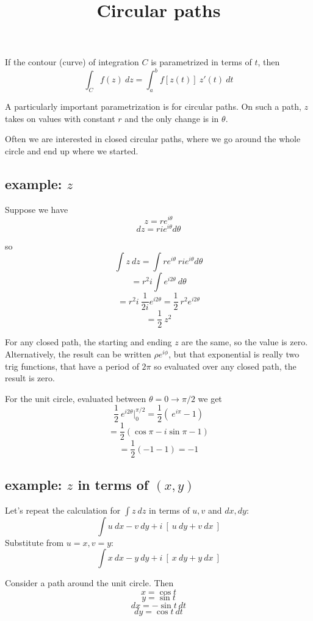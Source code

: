 \documentclass[11pt, oneside]{article}
\title{Circular paths}
\date{}
\begin{document}
\maketitle
\Large


If the contour (curve) of integration $C$ is parametrized in terms of $t$, then
\[ \int_C f(z) \ dz = \int_a^b f[z(t)] \ z'(t) \ dt \]

A particularly important parametrization is for circular paths.  On such a path, $z$ takes on values with constant $r$ and the only change is in $\theta$.

Often we are interested in closed circular paths, where we go around the whole circle and end up where we started.

\subsection*{example:  $z$}

Suppose we have
\[ z = re^{i \theta} \]
\[ dz = r i e^{i \theta} d \theta \]

so 
\[ \int z \ dz = \int re^{i \theta} \ r i e^{i \theta} d \theta \]
\[ = r^2 i \int e^{i 2\theta}  \ d \theta \]
\[ = r^2 i \ \frac{1}{2i} e^{i 2 \theta} = \frac{1}{2} \ r^2 e^{i 2 \theta} \]
\[ = \frac{1}{2} \ z^2 \]

For any closed path, the starting and ending $z$ are the same, so the value is zero.  Alternatively, the result can be written $\rho e^{i \phi}$, but that exponential is really two trig functions, that have a period of $2 \pi$ so evaluated over any closed path, the result is zero.

For the unit circle, evaluated between $\theta = 0 \rightarrow \pi/2$ we get
\[ \frac{1}{2} \ e^{i 2 \theta} \big |_0^{\pi/2} = \frac{1}{2} ( \ e^{i \pi} - 1) \]
\[ = \frac{1}{2} (\cos \pi - i \sin \pi - 1) \]
\[ = \frac{1}{2} (-1 - 1) = - 1 \]

\subsection*{example:  $z$ in terms of $(x,y)$}

Let's repeat the calculation for $\int z \ dz$ in terms of $u,v$ and $dx,dy$:
\[ \int u \ dx - v \ dy + i \ [ \ u \ dy + v \ dx \ ] \]
Substitute from $u = x, v = y$:
\[ \int x \ dx - y \ dy + i \ [ \ x \ dy + y \ dx \ ] \]

Consider a path around the unit circle.  Then
\[ x = \cos t \]
\[ y = \sin t \]
\[ dx = -\sin t \ dt \]
\[ dy = \cos t \ dt \]
\end{document}
